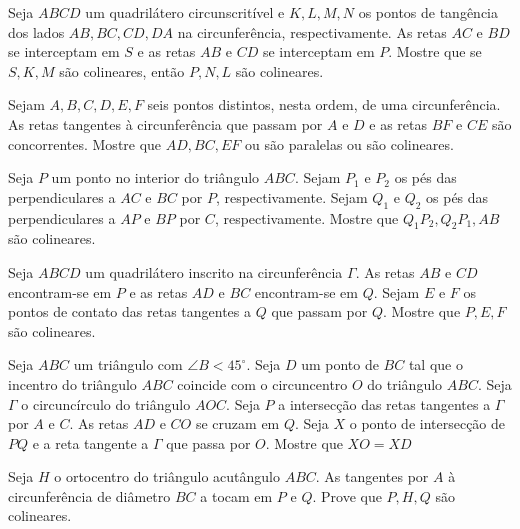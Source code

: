 \begin{questao}
  Seja $ABCD$ um quadrilátero circunscritível e
  $K,L,M,N$ os pontos de tangência dos lados $AB,BC,CD,DA$ na
  circunferência, respectivamente. As retas $AC$ e $BD$ se
  interceptam em $S$ e as retas $AB$ e $CD$ se interceptam em
  $P$. Mostre que se $S,K,M$ são colineares, então $P,N,L$ são
  colineares.
\end{questao}

\begin{questao}
  Sejam $A,B,C,D,E,F$ seis pontos distintos, nesta ordem,
  de uma circunferência. As retas tangentes à circunferência que
  passam por $A$ e $D$ e as retas $BF$ e $CE$ são
  concorrentes. Mostre que $AD,BC,EF$ ou são paralelas ou são
  colineares.
\end{questao}

\begin{questao}
  Seja $P$ um ponto no interior do triângulo
  $ABC$. Sejam $P_1$ e $P_2$ os pés das perpendiculares a $AC$
  e $BC$ por $P$, respectivamente. Sejam $Q_1$ e $Q_2$ os pés
  das perpendiculares a $AP$ e $BP$ por $C$,
  respectivamente. Mostre que $Q_1P_2, Q_2P_1,AB$ são colineares.
\end{questao}

\begin{questao}
  Seja $ABCD$ um quadrilátero inscrito na circunferência
  $\Gamma$. As retas $AB$ e $CD$ encontram-se em $P$ e as
  retas $AD$ e $BC$ encontram-se em $Q$. Sejam $E$ e $F$ os
  pontos de contato das retas tangentes a $Q$ que passam por
  $Q$. Mostre que $P,E,F$ são colineares.
\end{questao}

\begin{questao}
  Seja $ABC$ um triângulo com $\angle B <
  45^\circ$. Seja $D$ um ponto de $BC$ tal que o incentro do
  triângulo $ABC$ coincide com o circuncentro $O$ do triângulo
  $ABC$. Seja $\Gamma$ o circuncírculo do triângulo $AOC$. Seja
  $P$ a intersecção das retas tangentes a $\Gamma$ por $A$ e
  $C$. As retas $AD$ e $CO$ se cruzam em $Q$. Seja $X$ o
  ponto de intersecção de $PQ$ e a reta tangente a $\Gamma$ que
  passa por $O$. Mostre que $XO = XD$
\end{questao}

\begin{questao}
  Seja $H$ o ortocentro do triângulo acutângulo
  $ABC$. As tangentes por $A$ à circunferência de diâmetro $BC$
  a tocam em $P$ e $Q$. Prove que $P,H,Q$ são colineares.
\end{questao}

